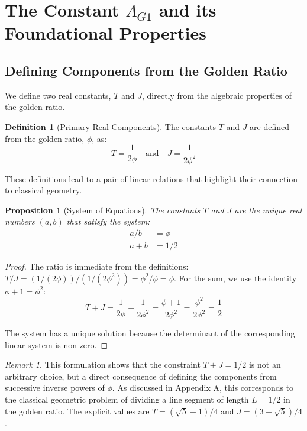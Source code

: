 \documentclass{amsart}
\theoremstyle{plain}
\newtheorem{proposition}[theorem]{Proposition}
\theoremstyle{definition}
\newtheorem{definition}[theorem]{Definition}
\theoremstyle{remark}
\newtheorem*{remark}{Remark}
\begin{document}
\section{The Constant \texorpdfstring{$\Lambda_{G1}$}{Lambda\_G1} and its Foundational Properties}

\subsection{Defining Components from the Golden Ratio}
We define two real constants, $T$ and $J$, directly from the algebraic properties of the golden ratio.
\begin{definition}[Primary Real Components]
The constants $T$ and $J$ are defined from the golden ratio, $\phi$, as:
$$ T = \frac{1}{2\phi} \quad \text{and} \quad J = \frac{1}{2\phi^2} $$

\end{definition}

These definitions lead to a pair of linear relations that highlight their connection to classical geometry.
\begin{proposition}[System of Equations]
The constants $T$ and $J$ are the unique real numbers $(a,b)$ that satisfy the system:
\begin{align}
    a/b &= \phi \label{eq:ratio} \\
    a+b &= 1/2 \label{eq:sum}
\end{align}

\end{proposition}
\begin{proof}
The ratio is immediate from the definitions: $T/J = (1/(2\phi))/(1/(2\phi^2)) = \phi^2/\phi = \phi$.
For the sum, we use the identity $\phi+1 = \phi^2$:
$$ T+J = \frac{1}{2\phi} + \frac{1}{2\phi^2} = \frac{\phi+1}{2\phi^2} = \frac{\phi^2}{2\phi^2} = \frac{1}{2} $$

The system has a unique solution because the determinant of the corresponding linear system is non-zero.
\end{proof}

\begin{remark}
This formulation shows that the constraint $T+J=1/2$ is not an arbitrary choice, but a direct consequence of defining the components from successive inverse powers of $\phi$.
As discussed in Appendix A, this corresponds to the classical geometric problem of dividing a line segment of length $L=1/2$ in the golden ratio.
The explicit values are $T = (\sqrt{5}-1)/4$ and $J = (3-\sqrt{5})/4$.
\end{remark}
\end{document}
